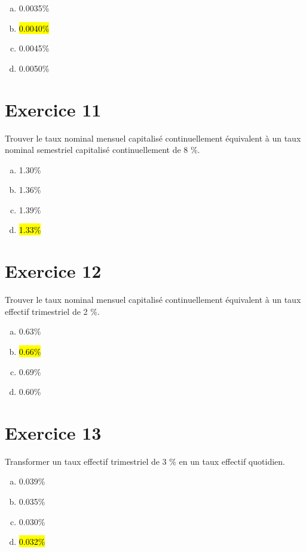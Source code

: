 \documentclass[10pt,a4paper]{article}
\begin{document}
\begin{enumerate}[a)]
\item 0.0035\%
\item \hl{0.0040\%}
\item 0.0045\%
\item 0.0050\%
\end{enumerate}


\section*{Exercice 11}
Trouver le taux nominal mensuel capitalisé continuellement équivalent à un taux nominal semestriel capitalisé continuellement de 8 \%.



\begin{enumerate}[a)]
\item 1.30\%
\item 1.36\%
\item 1.39\%
\item \hl{1.33\%}
\end{enumerate}

\section*{Exercice 12}
Trouver le taux nominal mensuel capitalisé continuellement équivalent à un taux effectif trimestriel de 2 \%.




\begin{enumerate}[a)]
\item 0.63\%
\item \hl{0.66\%}
\item 0.69\%
\item 0.60\%
\end{enumerate}


\section*{Exercice 13}
Transformer un taux effectif trimestriel de 3 \% en un taux effectif quotidien.



\begin{enumerate}[a)]
\item 0.039\%
\item 0.035\%
\item 0.030\%
\item \hl{0.032\%}
\end{enumerate}
\end{document}
